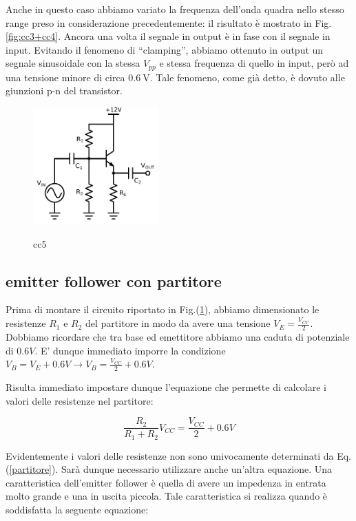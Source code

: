 Anche in questo caso abbiamo variato la frequenza dell'onda quadra nello stesso range preso in considerazione precedentemente: il risultato è mostrato in Fig. \ref{fig:cc3+cc4}.
Ancora una volta il segnale in output è in fase con il segnale in input.
Evitando il fenomeno di ``clamping'', abbiamo ottenuto in output un segnale sinusoidale con la stessa $V_{pp}$ e stessa frequenza di quello in input, però ad una tensione minore di circa $\SI{0.6}{\volt}$. Tale fenomeno, come già detto, è dovuto alle giunzioni p-n del transistor.

\begin{figure}
	\caption{cc5}
	\includegraphics[height=45mm]{cc5.pdf}
	\label{fig:cc5}
\end{figure}

\subsection{emitter follower con partitore}

%
%

Prima di montare il circuito riportato in Fig.(\ref{fig:cc5}), abbiamo dimensionato le resistenze $R_1$ e $R_2$ del partitore in modo da avere una tensione $V_E=\frac{V_{CC}}{2}$. Dobbiamo ricordare che tra base ed emettitore abbiamo una caduta di potenziale di $0.6V$. E' dunque immediato imporre la condizione $V_B=V_E + 0.6V \rightarrow V_B=\frac{V_{CC}}{2} + 0.6V $.

Risulta immediato impostare dunque l'equazione che permette di calcolare i valori delle resistenze nel partitore:

\begin{equation}
\frac{R_2}{R_1+R_2} V_{CC}=\frac{V_{CC}}{2} + 0.6V
\label{partitore}
\end{equation}

Evidentemente i valori delle resistenze non sono univocamente determinati da Eq.(\ref{partitore}). Sarà dunque necessario utilizzare anche un'altra equazione. Una caratteristica dell'emitter follower è quella di avere un impedenza in entrata molto grande e una in uscita piccola. Tale caratteristica si realizza quando è soddisfatta la seguente equazione:

